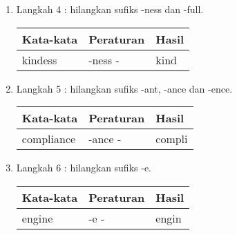 \begin{enumerate}
    \item Langkah 4 : hilangkan sufiks -ness dan -full.
\begin{table}[]
\centering
\begin{tabular}{|l|l|l|}
\hline
Kata-kata & Peraturan          & Hasil  \\ \hline
kindess  & -ness - & kind \\ \hline
\end{tabular}
\end{table}

    \item Langkah 5 : hilangkan sufiks -ant, -ance dan -ence.
\begin{table}[]
\centering
\begin{tabular}{|l|l|l|}
\hline
Kata-kata & Peraturan          & Hasil  \\ \hline
compliance  & -ance - & compli \\ \hline
\end{tabular}
\end{table}

    \item Langkah 6 : hilangkan sufiks -e.
\begin{table}[]
\centering
\begin{tabular}{|l|l|l|}
\hline
Kata-kata & Peraturan          & Hasil  \\ \hline
engine  & -e - & engin \\ \hline
\end{tabular}
\end{table}

\end{enumerate}


